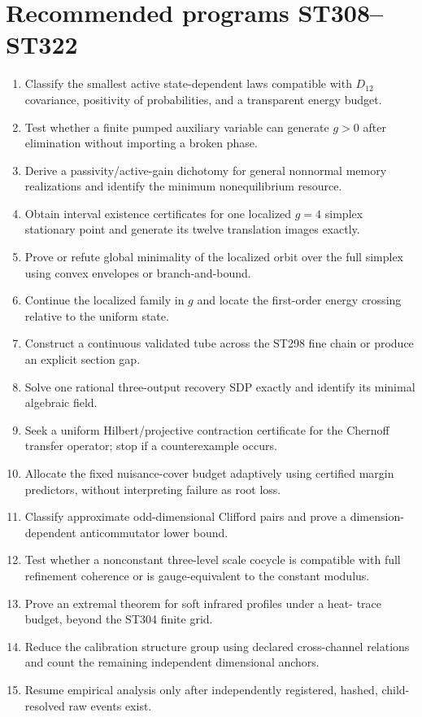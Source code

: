 \documentclass[11pt,a4paper]{article}
\begin{document}
\section{Recommended programs ST308--ST322}
\begin{enumerate}
\item[\textbf{ST308}.] Classify the smallest active state-dependent laws compatible with
$D_{12}$ covariance, positivity of probabilities, and a transparent energy budget.
\item[\textbf{ST309}.] Test whether a finite pumped auxiliary variable can generate $g>0$
after elimination without importing a broken phase.
\item[\textbf{ST310}.] Derive a passivity/active-gain dichotomy for general nonnormal memory
realizations and identify the minimum nonequilibrium resource.
\item[\textbf{ST311}.] Obtain interval existence certificates for one localized $g=4$
simplex stationary point and generate its twelve translation images exactly.
\item[\textbf{ST312}.] Prove or refute global minimality of the localized orbit over the full
simplex using convex envelopes or branch-and-bound.
\item[\textbf{ST313}.] Continue the localized family in $g$ and locate the first-order
energy crossing relative to the uniform state.
\item[\textbf{ST314}.] Construct a continuous validated tube across the ST298 fine chain or
produce an explicit section gap.
\item[\textbf{ST315}.] Solve one rational three-output recovery SDP exactly and identify its
minimal algebraic field.
\item[\textbf{ST316}.] Seek a uniform Hilbert/projective contraction certificate for the
Chernoff transfer operator; stop if a counterexample occurs.
\item[\textbf{ST317}.] Allocate the fixed nuisance-cover budget adaptively using certified
margin predictors, without interpreting failure as root loss.
\item[\textbf{ST318}.] Classify approximate odd-dimensional Clifford pairs and prove a
dimension-dependent anticommutator lower bound.
\item[\textbf{ST319}.] Test whether a nonconstant three-level scale cocycle is compatible
with full refinement coherence or is gauge-equivalent to the constant modulus.
\item[\textbf{ST320}.] Prove an extremal theorem for soft infrared profiles under a heat-
trace budget, beyond the ST304 finite grid.
\item[\textbf{ST321}.] Reduce the calibration structure group using declared cross-channel
relations and count the remaining independent dimensional anchors.
\item[\textbf{ST322}.] Resume empirical analysis only after independently registered,
hashed, child-resolved raw events exist.
\end{enumerate}
\end{document}
